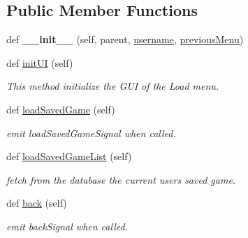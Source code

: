 \subsection*{Public Member Functions}
\begin{DoxyCompactItemize}
\item 
\hypertarget{classsrc_1_1load__menu_1_1_load_menu_a6b067e9ede752fd13ed4df84570083b7}{}def {\bfseries \+\_\+\+\_\+init\+\_\+\+\_\+} (self, parent, \hyperlink{classsrc_1_1load__menu_1_1_load_menu_ab1c940f6352015a62d85b668bc6ebb01}{username}, \hyperlink{classsrc_1_1load__menu_1_1_load_menu_a266279b7ed3e68889b07c1785251c806}{previous\+Menu})\label{classsrc_1_1load__menu_1_1_load_menu_a6b067e9ede752fd13ed4df84570083b7}

\item 
def \hyperlink{classsrc_1_1load__menu_1_1_load_menu_ae10c4104f4245eaba4772a7f29485ff4}{init\+U\+I} (self)
\begin{DoxyCompactList}\small\item\em This method initialize the G\+U\+I of the Load menu. \end{DoxyCompactList}\item 
def \hyperlink{classsrc_1_1load__menu_1_1_load_menu_ac3ab22ee56c51e7cb02f27344d6bfcbd}{load\+Saved\+Game} (self)
\begin{DoxyCompactList}\small\item\em emit load\+Saved\+Game\+Signal when called. \end{DoxyCompactList}\item 
def \hyperlink{classsrc_1_1load__menu_1_1_load_menu_af7b9c789c68fb85b2d4e2bfd211e201d}{load\+Saved\+Game\+List} (self)
\begin{DoxyCompactList}\small\item\em fetch from the database the current user\textquotesingle{}s saved game. \end{DoxyCompactList}\item 
def \hyperlink{classsrc_1_1load__menu_1_1_load_menu_ac1756d59b9d5d3c026d4cb971bb6a657}{back} (self)
\begin{DoxyCompactList}\small\item\em emit back\+Signal when called. \end{DoxyCompactList}\end{DoxyCompactItemize}
